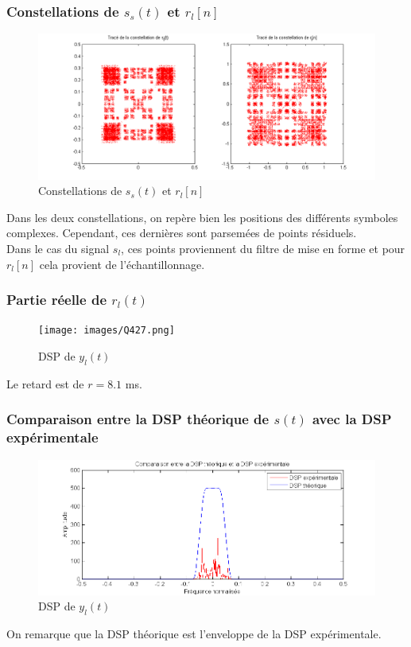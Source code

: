 \documentclass[11pt]{article}
\begin{document}
		\subsubsection{Constellations de $s_s(t)$ et $r_l[n]$}
			\begin{figure}[!h]
				\centering
				\includegraphics[scale=0.5]{images/Q426.png}
				\caption{Constellations de $s_s(t)$ et $r_l[n]$}
				\label{Q426}
			\end{figure}
			Dans les deux constellations, on repère bien les positions des différents symboles complexes. Cependant, ces dernières sont parsemées de points résiduels.\\
			Dans le cas du signal $s_l$, ces points proviennent du filtre de mise en forme et pour $r_l[n]$ cela provient de l'échantillonnage. 
			
		\subsubsection{Partie réelle de $r_l(t)$}
			\begin{figure}[!h]
				\centering
				\texttt{[image: images/Q427.png]}
				\caption{DSP de $y_l(t)$}
				\label{Q427}
			\end{figure}
			Le retard est de $r = 8.1$ ms.
		
\newpage
		
		\subsubsection{Comparaison entre la DSP théorique de $s(t)$ avec la DSP expérimentale}
			\begin{figure}[!h]
				\centering
				\includegraphics[scale=0.5]{images/Q429.png}
				\caption{DSP de $y_l(t)$}
				\label{Q429}
			\end{figure}
			On remarque que la DSP théorique est l'enveloppe de la DSP expérimentale.
			
\end{document}
